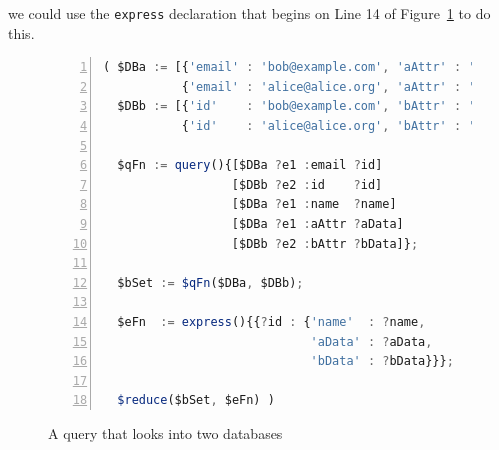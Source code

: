 \documentclass[9pt,letterpaper]{article}
\newcommand{\stt}[1]{\texttt{#1}} %
\begin{document}
\hspace{-2em} we could use the \stt{express} declaration that begins on Line 14 of Figure~\ref{code:two-database-query-express} to do this.

\begin{figure}[H]
    \caption{A query that looks into two databases}
    \label{code:two-database-query-express}
\begin{lstlisting}[language=JavaScript,numberstyle=\scriptsize,basicstyle=\ttfamily\scriptsize,numbers=left,stepnumber=1,breaklines=true]
( $DBa := [{'email' : 'bob@example.com', 'aAttr' : 'Bob-A-data',   'name' : 'Bob'},
           {'email' : 'alice@alice.org', 'aAttr' : 'Alice-A-data', 'name' : 'Alice'}];
  $DBb := [{'id'    : 'bob@example.com', 'bAttr' : 'Bob-B-data'},
           {'id'    : 'alice@alice.org', 'bAttr' : 'Alice-B-data'}];

  $qFn := query(){[$DBa ?e1 :email ?id]
                  [$DBb ?e2 :id    ?id]
                  [$DBa ?e1 :name  ?name]
                  [$DBa ?e1 :aAttr ?aData]
                  [$DBb ?e2 :bAttr ?bData]};

  $bSet := $qFn($DBa, $DBb);

  $eFn  := express(){{?id : {'name'  : ?name,
                             'aData' : ?aData,
                             'bData' : ?bData}}};

  $reduce($bSet, $eFn) )
\end{lstlisting}
\end{figure} \vspace{-2em}
\end{document}
